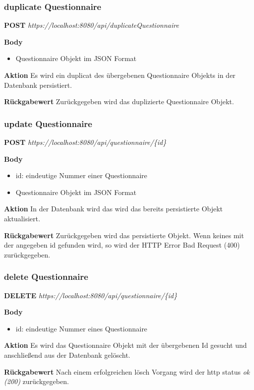 \subsubsection{duplicate Questionnaire}
\textbf{POST} \emph{https://localhost:8080/api/duplicateQuestionnaire}

\textbf{Body}
\begin{itemize}
    \item Questionnaire Objekt im JSON Format
\end{itemize}

\textbf{Aktion}
Es wird ein duplicat des übergebenen Questionnaire Objekts in der Datenbank persistiert.

\textbf{Rückgabewert}
Zurückgegeben wird das duplizierte Questionnaire Objekt.

\subsubsection{update Questionnaire}
\textbf{POST} \emph{https://localhost:8080/api/questionnaire/\{id\}}

\textbf{Body}
\begin{itemize}
    \item id: eindeutige Nummer einer Questionnaire
    \item Questionnaire Objekt im JSON Format
\end{itemize}

\textbf{Aktion}
In der Datenbank wird das wird das bereits persistierte Objekt aktualisiert.

\textbf{Rückgabewert}
Zurückgegeben wird das persistierte Objekt. Wenn keines mit der angegeben id gefunden wird, so wird der HTTP Error Bad Request
(400) zurückgegeben.

\subsubsection{delete Questionnaire}
\textbf{DELETE} \emph{https://localhost:8080/api/questionnaire/\{id\}}

\textbf{Body}
\begin{itemize}
    \item id: eindeutige Nummer eines Questionnaire
\end{itemize}

\textbf{Aktion}
Es wird das Questionnaire Objekt mit der übergebenen Id gesucht und anschließend
aus der Datenbank gelöscht.

\textbf{Rückgabewert}
Nach einem erfolgreichen lösch Vorgang wird der http status \emph{ok (200)} zurückgegeben.

